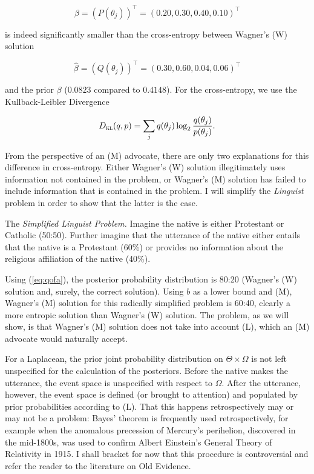 \begin{equation}
  \label{eq:p14}
  \beta=(P(\theta_{j}))^{\intercal}=(0.20,0.30,0.40,0.10)^{\intercal}
\end{equation}

is indeed significantly smaller than the cross-entropy between
Wagner's (W) solution 

\begin{equation}
  \label{eq:p15}
  \hat{\beta}=(Q(\theta_{j}))^{\intercal}=(0.30,0.60,0.04,0.06)^{\intercal}
\end{equation}

and the prior $\beta$ ($0.0823$ compared to $0.4148$). For the
cross-entropy, we use the Kullback-Leibler Divergence

\begin{equation}
  \label{eq:kl}
  D_{\textsc{kl}}(q,p)=\sum_{j}q(\theta_{j})\log_{2}\frac{q(\theta_{j})}{p(\theta_{j})}.
\end{equation}

From the perspective of an (M) advocate, there are only two
explanations for this difference in cross-entropy. Either Wagner's (W)
solution illegitimately uses information not contained in the problem,
or Wagner's (M) solution has failed to include information that is
contained in the problem. I will simplify the \emph{Linguist} problem
in order to show that the latter is the case.

\begin{quotex}
  The \emph{Simplified Linguist Problem.} Imagine the native is either
  Protestant or Catholic (50:50). Further imagine that the utterance
  of the native either entails that the native is a Protestant (60\%)
  or provides no information about the religious affiliation of the
  native (40\%).
\end{quotex}

Using (\ref{eq:qofa}), the posterior probability distribution is 80:20
(Wagner's (W) solution and, surely, the correct solution). Using $b$
as a lower bound and (M), Wagner's (M) solution for this radically
simplified problem is 60:40, clearly a more entropic solution than
Wagner's (W) solution. The problem, as we will show, is that Wagner's
(M) solution does not take into account (L), which an (M) advocate
would naturally accept.

For a Laplacean, the prior joint probability distribution on
$\Theta\times\Omega$ is not left unspecified for the calculation of
the posteriors. Before the native makes the utterance, the event space
is unspecified with respect to $\Omega$. After the utterance, however,
the event space is defined (or brought to attention) and populated by
prior probabilities according to (L). That this happens
retrospectively may or may not be a problem: Bayes' theorem is
frequently used retrospectively, for example when the anomalous
precession of Mercury's perihelion, discovered in the mid-1800s, was
used to confirm Albert Einstein's General Theory of Relativity in
1915. I shall bracket for now that this procedure is controversial and
refer the reader to the literature on Old Evidence.

